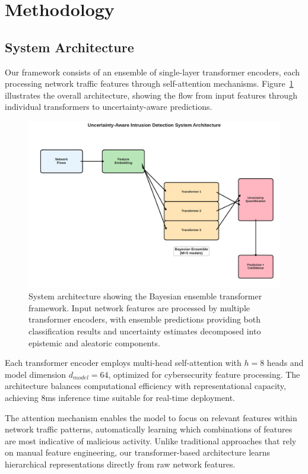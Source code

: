 \documentclass[journal]{IEEEtran}
\begin{document}
\section{Methodology}
\label{sec:methodology}

\subsection{System Architecture}

Our framework consists of an ensemble of single-layer transformer encoders, each processing network traffic features through self-attention mechanisms. Figure~\ref{fig:system_overview} illustrates the overall architecture, showing the flow from input features through individual transformers to uncertainty-aware predictions.

\begin{figure}[t]
\centering
\includegraphics[width=0.8\columnwidth]{figures/system_overview.pdf}
\caption{System architecture showing the Bayesian ensemble transformer framework. Input network features are processed by multiple transformer encoders, with ensemble predictions providing both classification results and uncertainty estimates decomposed into epistemic and aleatoric components.}
\label{fig:system_overview}
\end{figure}

Each transformer encoder employs multi-head self-attention with $h=8$ heads and model dimension $d_{model}=64$, optimized for cybersecurity feature processing. The architecture balances computational efficiency with representational capacity, achieving 8ms inference time suitable for real-time deployment.

The attention mechanism enables the model to focus on relevant features within network traffic patterns, automatically learning which combinations of features are most indicative of malicious activity. Unlike traditional approaches that rely on manual feature engineering, our transformer-based architecture learns hierarchical representations directly from raw network features.
\end{document}
